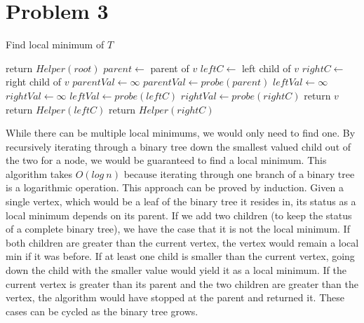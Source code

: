 \documentclass[12pt]{article}
\begin{document}
\section*{Problem 3}
\begin{algorithm}
\caption{Find local minimum of $T$}
\begin{algorithmic}[1]
    \State return $Helper(root)$
\EndFunction
\State
{}
    \State $parent \gets $ parent of $v$
    \State $leftC \gets $ left child of $v$
    \State $rightC \gets $ right child of $v$
    \State
        \State $parentVal \gets \infty$
    \Else
        \State $parentVal \gets probe(parent)$
    \EndIf
        \State $leftVal \gets \infty$
        \State $rightVal \gets \infty$
    \Else
        \State $leftVal \gets probe(leftC)$ 
        \State $rightVal \gets probe(rightC)$
    \EndIf
    \State
        \State return $v$
    \EndIf
    \State
        \State return $Helper(leftC)$
    \EndIf
    \State return $Helper(rightC)$
\EndFunction
\end{algorithmic}
\end{algorithm}
While there can be multiple local minimums, we would only need to find one. By recursively 
iterating through a binary tree down the smallest valued child out of the two for a node, 
we would be guaranteed to find a local minimum. This algorithm takes $O(log\ n)$ because
iterating through one branch of a binary tree is a logarithmic operation.
\newline
\newline
This approach can be proved by induction. Given a single vertex, which would be a leaf of the binary
tree it resides in, its status as a local minimum depends on its parent. If we add two children (to keep
the status of a complete binary tree), we have the case that it is not the local minimum. If both
children are greater than the current vertex, the vertex would remain a local min if it was before. If at least one
child is smaller than the current vertex, going down the child with the smaller value would yield it as 
a local minimum. If the current vertex is greater than its parent and the two children are greater than the vertex,
the algorithm would have stopped at the parent and returned it. These cases can be cycled as the binary tree grows.

\newpage
\end{document}

